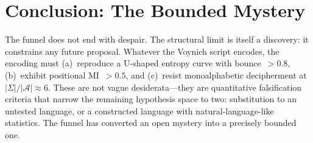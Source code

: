\documentclass[11pt,a4paper]{article}
\begin{document}
\section{Conclusion: The Bounded Mystery}

The funnel does not end with despair.  The structural limit is itself a discovery: it constrains any future proposal.  Whatever the Voynich script encodes, the encoding must (a)~reproduce a U-shaped entropy curve with bounce~$> 0.8$, (b)~exhibit positional MI~$> 0.5$, and (c)~resist monoalphabetic decipherment at $|\Sigma|/|\mathcal{A}| \approx 6$.  These are not vague desiderata---they are quantitative falsification criteria that narrow the remaining hypothesis space to two: substitution to an untested language, or a constructed language with natural-language-like statistics.  The funnel has converted an open mystery into a precisely bounded one.
\end{document}

